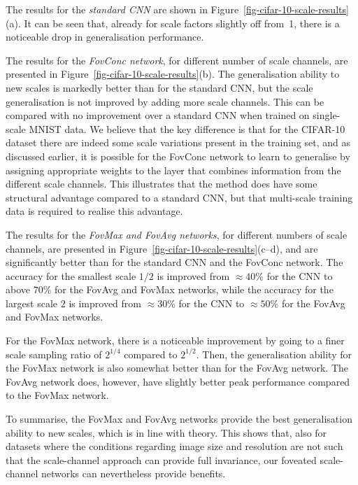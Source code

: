 \documentclass[twocolumn,runningheads]{svjour3}
\begin{document}
The results for the {\em standard CNN\/} are shown in Figure~\ref{fig-cifar-10-scale-results}(a).
It can be seen that, already for scale factors slightly off from~1,
there is a noticeable drop in generalisation performance.

The results for the {\em FovConc network\/}, for different number of
scale channels, are presented in Figure~\ref{fig-cifar-10-scale-results}(b).
The generalisation ability to new scales is markedly better than for the
standard CNN, but the scale generalisation is not improved by
adding more scale channels. This can be compared with no improvement over a standard CNN when trained on single-scale MNIST data. We believe that the key difference is that for the CIFAR-10 dataset there are
indeed some scale variations present in the training set, and as
discussed earlier, it is possible for the FovConc network to learn to generalise by assigning appropriate weights to the layer that combines
information from the different scale channels. This illustrates that the method does have some structural advantage compared to a standard CNN,
but that multi-scale training data is required to realise this advantage. 

The results for the {\em FovMax and FovAvg networks\/}, for different numbers of
scale channels, are presented in Figure~\ref{fig-cifar-10-scale-results}(c--d), and
are significantly better than for the standard CNN and the FovConc
network. The accuracy for the smallest scale $1/2$ is improved from $\approx 40 \% $ 
for the CNN to above $70 \% $ for the FovAvg and FovMax networks, while the accuracy 
for the largest scale $2$ is improved from $\approx 30 \% $ for the CNN to $\approx 50 \% $ for the FovAvg and FovMax networks. 

For the FovMax network, there is a noticeable improvement by going to
a finer scale sampling ratio of $2^{1/4}$ compared to $2^{1/2}$.
Then, the generalisation ability for the FovMax network is also somewhat better than for the
FovAvg network. The FovAvg network does, however, have slightly better peak performance compared to the FovMax network. 

To summarise, the FovMax and FovAvg networks provide the best generalisation
ability to new scales, which is in line with theory.
This shows that, also for datasets where the conditions regarding image size and
resolution are not such that the scale-channel approach can provide
full invariance, our foveated scale-channel networks can nevertheless
provide benefits.
\end{document}

